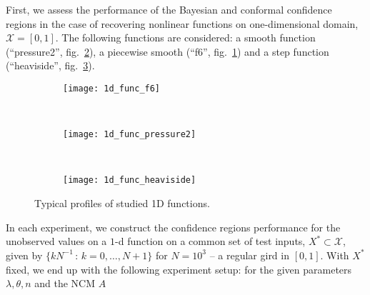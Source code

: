 \documentclass{ITaSconf}
\newcommand{\Xcal}{\mathcal{X}}
\begin{document}
First, we assess the performance of the Bayesian and conformal confidence regions
in the case of recovering nonlinear functions on one-dimensional domain, $\Xcal =
[0, 1]$. The following functions are considered: a smooth function (``pressure2'',
fig.~\ref{fig:1dfunc_pressure2}), a piecewise smooth (``f6'', fig.~\ref{fig:1dfunc_f6})
and a step function (``heaviside'', fig.~\ref{fig:1dfunc_heaviside}).
\begin{figure}[t, width=0.5\textwidth]
  \centering
  \begin{subfigure}[b]{0.3\linewidth}
    \texttt{[image: 1d\_func\_f6]}
    \caption{} \label{fig:1dfunc_f6}
  \end{subfigure}~
  \begin{subfigure}[b]{0.3\linewidth}
    \texttt{[image: 1d\_func\_pressure2]}
    \caption{} \label{fig:1dfunc_pressure2}
  \end{subfigure}~
  \begin{subfigure}[b]{0.3\linewidth}
    \texttt{[image: 1d\_func\_heaviside]}
    \caption{} \label{fig:1dfunc_heaviside}
  \end{subfigure}
  \caption{Typical profiles of studied 1D functions.} \label{fig:1dfunc}
\end{figure}
In each experiment, we construct the confidence regions performance for the unobserved
values on a $1$-d function on a common set of test inputs, $X^* \subset \Xcal$,
given by $\{k N^{-1}\,:\,k=0,\ldots, N+1\}$ for $N=10^3$ -- a regular gird in $[0, 1]$.
With $X^*$ fixed, we end up with the following experiment setup: for the given
parameters $\lambda, \theta, n$ and the NCM $A$
\end{document}
